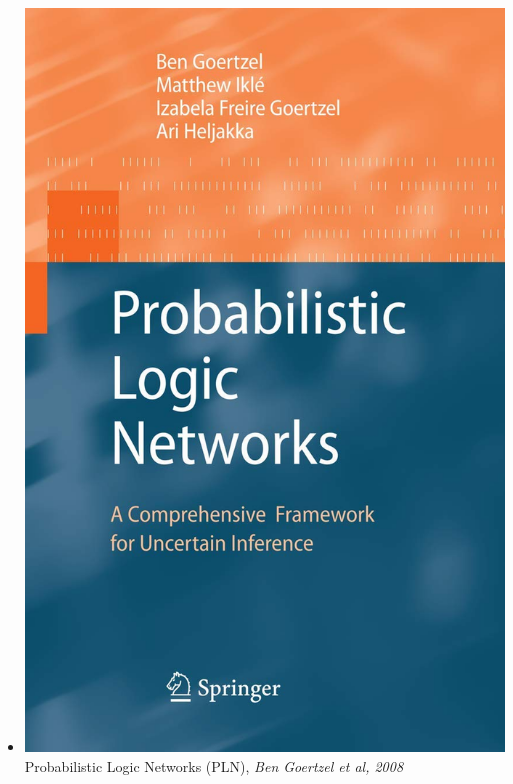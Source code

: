 \documentclass[aspectratio=169]{beamer}
\begin{document}
\begin{frame}
\begin{itemize}
  \item \includegraphics[scale=0.02]{figs/PLN.jpg} Probabilistic Logic Networks (PLN), \emph{Ben Goertzel et al, 2008}

\end{itemize}
\end{frame}
\end{document}
